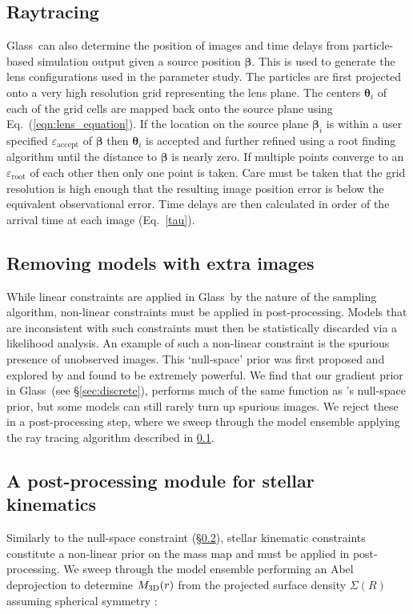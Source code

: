 \documentclass[galley,usenatbib]{mn2e}
\newcommand{\Glass}{{\sc Glass}}
\newcommand{\eps}{\ensuremath{\varepsilon}}
\newcommand{\eqnref}[1] {Eq.~(\ref{#1})}
\newcommand{\eqnrefp}[1] {(Eq.~\ref{#1})}
\renewcommand{\vec}[1]{\ensuremath{\boldsymbol{#1}}}
\begin{document}
\subsection{Raytracing}\label{Raytracing}
\Glass\ can also determine the position of images and time delays from 
particle-based simulation output given a source position $\vec\beta$. This is
used to generate the lens configurations used in the parameter study.  The
particles are first projected onto a very high resolution grid representing the
lens plane. The centers $\vec\theta_i$ of each of the grid cells are mapped
back onto the source plane using \eqnref{eqn:lens_equation}. If the location on
the source plane $\vec\beta_i$ is within a user specified
$\eps_\mathrm{accept}$ of $\vec\beta$ then $\vec\theta_i$ is 
accepted and further refined using a root finding algorithm until the distance
to $\vec\beta$ is nearly zero. If multiple points converge to an
$\eps_\mathrm{root}$ of each other then only one point is taken.  Care must be
taken that the grid resolution is high enough that the resulting image position
error is below the equivalent observational error. Time delays are then
calculated in order of the arrival time at each image \eqnrefp{tau}.

\subsection{Removing models with extra images}\label{sec:glassextraimages} 
While linear constraints are applied in \Glass\ by the nature of the sampling
algorithm, non-linear constraints must be applied in post-processing. Models
that are inconsistent with such constraints must then be statistically
discarded via a likelihood analysis. An example of such a non-linear constraint
is the spurious presence of unobserved images. This `null-space' prior was
first proposed and explored by \citet{2006MNRAS.367.1209L} and found to be
extremely powerful. We find that our gradient prior in \Glass\ (see
\S\ref{sec:discrete}), performs much of the same function as
\citeauthor{2006MNRAS.367.1209L}'s null-space prior, but some models can still
rarely turn up spurious images. We reject these in a post-processing step,
where we sweep through the model ensemble applying the ray tracing algorithm
described in \ref{Raytracing}.

\subsection{A post-processing module for stellar kinematics}\label{sec:glasskinematics} 
Similarly to the null-space constraint (\S\ref{sec:glassextraimages}), stellar
kinematic constraints constitute a non-linear prior on the mass map and must be
applied in post-processing. We sweep through the model ensemble performing an
Abel deprojection to determine $M_{\rm 3D}(r)$ from the projected surface density $\Sigma(R)$
assuming spherical symmetry \citep[e.g.][]{2008gady.book.....B,2008MNRAS.390.1647B}: 
\end{document}
